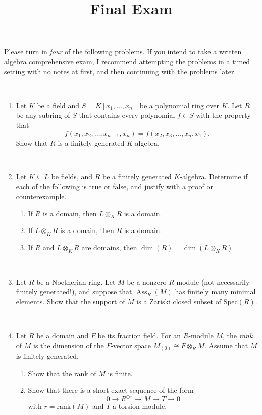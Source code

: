 \documentclass{amsart}[12pt]
\title{Final Exam}
\def\Ass{\operatorname{Ass}}
\numberwithin{equation}{section}
\theoremstyle{plain} %
\theoremstyle{definition}
\theoremstyle{remark}
\begin{document}
\onehalfspacing

\maketitle

\noindent Please turn in \emph{four} of the following problems. If you intend to take a written algebra comprehensive exam, I recommend attempting the problems in a timed setting with no notes at first, and then continuing with the problems later.

\


\begin{enumerate}




\item Let $K$ be a field and $S=K[x_1,\dots,x_n]$ be a polynomial ring over $K$. Let $R$ be any subring of $S$ that contains every polynomial $f\in S$ with the property that 
\[ f(x_1,x_2,\dots, x_{n-1}, x_n) = f(x_2, x_3,\dots,x_n, x_1).\]
Show that $R$ is a finitely generated $K$-algebra.

\

\item Let $K \subseteq L$ be fields, and $R$ be a finitely generated $K$-algebra. Determine if each of the following is true or false, and justify with a proof or counterexample.
\begin{enumerate}
\item If $R$ is a domain, then $L\otimes_K R$ is a domain.
\item If $L\otimes_K R$ is a domain, then $R$ is a domain.
\item If $R$ and $L\otimes_K R$ are domains, then $\dim(R) = \dim(L\otimes_K R)$.
\end{enumerate}

\

\item\label{Zar} Let $R$ be a Noetherian ring. Let $M$ be a nonzero $R$-module (not necessarily finitely generated!), and suppose that $\Ass_R(M)$ has finitely many minimal elements. Show that the support of $M$ is a Zariski closed subset of $\mathrm{Spec}(R)$.


\

\item Let $R$ be a domain and $F$ be its fraction field. For an $R$-module $M$, the \emph{rank} of $M$ is the dimension of the $F$-vector space $M_{(0)}\cong F\otimes_R M$. Assume that $M$ is finitely generated.
\begin{enumerate}
\item Show that the rank of $M$ is finite.
\item Show that there is a short exact sequence of the form
\[ 0 \to R^{\oplus r} \to M \to T \to 0\]
with $r=\mathrm{rank}(M)$ and $T$ a torsion module.
\end{enumerate}


\end{enumerate}
\end{document}

